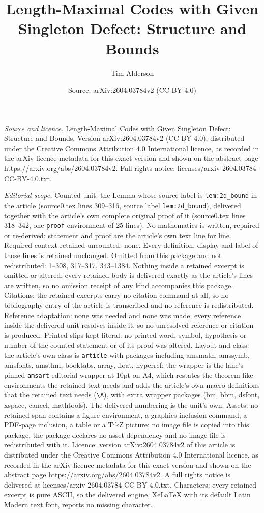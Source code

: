 \documentclass[10pt,a4paper]{amsart}
\title[Length-Maximal Codes with Given Singleton Defect: Structure ]{Length-Maximal Codes with Given Singleton Defect: Structure and Bounds}
\author{Tim Alderson}
\date{Source: arXiv:2604.03784v2 (CC BY 4.0)}
\begin{document}
\maketitle

\noindent\emph{Source and licence.} Length-Maximal Codes with Given Singleton Defect: Structure and Bounds. Version arXiv:2604.03784v2 (CC BY 4.0), distributed under the Creative Commons Attribution 4.0 International licence, as recorded in the arXiv licence metadata for this exact version and shown on the abstract page https://arxiv.org/abs/2604.03784v2. Full rights notice: licenses/arxiv-2604.03784-CC-BY-4.0.txt.\par\smallskip

\noindent\textit{Editorial scope.} Counted unit: the Lemma whose source label is \texttt{lem:2d\_bound} in the article (source0.tex lines 309--316, source label \texttt{lem:2d\_bound}), delivered together with the article's own complete original proof of it (source0.tex lines 318--342, one \texttt{proof} environment of 25 lines). No mathematics is written, repaired or re-derived: statement and proof are the article's own text line for line. Required context retained uncounted: none. Every definition, display and label of those lines is retained unchanged. Omitted from this package and not redistributed: 1--308, 317--317, 343--1384. Nothing inside a retained excerpt is omitted or altered: every retained body is delivered exactly as the article's lines are written, so no omission receipt of any kind accompanies this package. Citations: the retained excerpts carry no citation command at all, so no bibliography entry of the article is transcribed and no reference is redistributed. Reference adaptation: none was needed and none was made; every reference inside the delivered unit resolves inside it, so no unresolved reference or citation is produced. Printed slips kept literal: no printed word, symbol, hypothesis or number of the counted statement or of its proof was altered. Layout and class: the article's own class is \texttt{article} with packages including amsmath, amssymb, amsfonts, amsthm, booktabs, array, float, hyperref; the wrapper is the lane's pinned \texttt{amsart} editorial wrapper at 10pt on A4, which restates the theorem-like environments the retained text needs and adds the article's own macro definitions that the retained text needs (\texttt{\textbackslash A}), with extra wrapper packages (bm, bbm, dsfont, xspace, cancel, mathtools). The delivered numbering is the unit's own. Assets: no retained span contains a figure environment, a graphics-inclusion command, a PDF-page inclusion, a table or a TikZ picture; no image file is copied into this package, the package declares no asset dependency and no image file is redistributed with it. Licence: version arXiv:2604.03784v2 of this article is distributed under the Creative Commons Attribution 4.0 International licence, as recorded in the arXiv licence metadata for this exact version and shown on the abstract page https://arxiv.org/abs/2604.03784v2. A full rights notice is delivered at licenses/arxiv-2604.03784-CC-BY-4.0.txt. Characters: every retained excerpt is pure ASCII, so the delivered engine, XeLaTeX with its default Latin Modern text font, reports no missing character.
\end{document}
